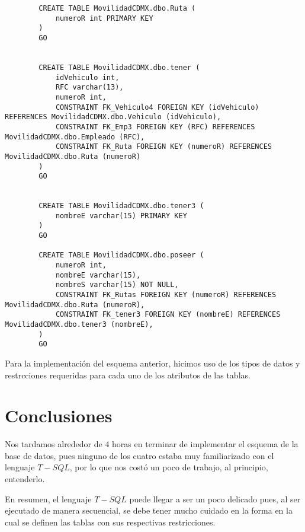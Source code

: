 \documentclass[12pt, letterpaper]{article}
\begin{document}
{\begin{lstlisting}
        CREATE TABLE MovilidadCDMX.dbo.Ruta (
            numeroR int PRIMARY KEY
        ) 
        GO


        CREATE TABLE MovilidadCDMX.dbo.tener (
            idVehiculo int,
            RFC varchar(13),
            numeroR int,
            CONSTRAINT FK_Vehiculo4 FOREIGN KEY (idVehiculo) REFERENCES MovilidadCDMX.dbo.Vehiculo (idVehiculo),
            CONSTRAINT FK_Emp3 FOREIGN KEY (RFC) REFERENCES MovilidadCDMX.dbo.Empleado (RFC),
            CONSTRAINT FK_Ruta FOREIGN KEY (numeroR) REFERENCES MovilidadCDMX.dbo.Ruta (numeroR)
        ) 
        GO


        CREATE TABLE MovilidadCDMX.dbo.tener3 (
            nombreE varchar(15) PRIMARY KEY
        ) 
        GO

        CREATE TABLE MovilidadCDMX.dbo.poseer (
            numeroR int,
            nombreE varchar(15),
            nombreS varchar(15) NOT NULL,
            CONSTRAINT FK_Rutas FOREIGN KEY (numeroR) REFERENCES MovilidadCDMX.dbo.Ruta (numeroR),
            CONSTRAINT FK_tener3 FOREIGN KEY (nombreE) REFERENCES MovilidadCDMX.dbo.tener3 (nombreE),
        ) 
        GO
    \end{lstlisting}}

    Para la implementación del esquema anterior, hicimos uso de los tipos de datos y restrcciones requeridas para cada uno de los atributos de las tablas.

    \section*{Conclusiones}
    Nos tardamos alrededor de 4 horas en terminar de implementar el esquema de la base de datos, pues ninguno de los cuatro
    estaba muy familiarizado con el lenguaje $T-SQL$, por lo que nos costó un poco de trabajo, al principio, entenderlo. \vspace{.3cm}

    En resumen, el lenguaje $T-SQL$ puede llegar a ser un poco delicado pues, al ser ejecutado de manera secuencial, se debe tener
    mucho cuidado en la forma en la cual se definen las tablas con sus respectivas restricciones.
    
\end{document}
